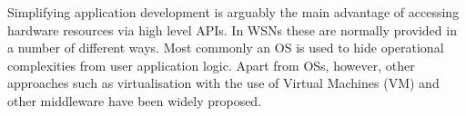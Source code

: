 Simplifying application development is arguably the main advantage of accessing hardware resources via high level APIs. In WSNs these are normally provided in a number of different ways. Most commonly an OS is used to hide operational complexities from user application logic. Apart from OSs, however, other approaches such as virtualisation with the use of Virtual Machines (VM) \cite{Levis:2002:MTV:635506.605407,simon2005squawk,hong2009tinyvm,4300022} and other middleware \cite{Fok:2009:AMA:1552297.1552299,1621014,6529470,6671886} have been widely proposed.

